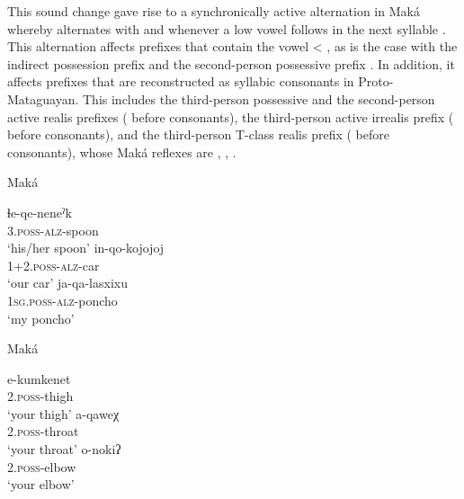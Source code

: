 This sound change gave rise to a synchronically active alternation in Maká whereby  alternates with  and  whenever a low vowel follows in the next syllable \citep[106–108]{AG-BG03}. This alternation affects prefixes that contain the vowel  < , as is the case with the indirect possession prefix   and the second-person possessive prefix  . In addition, it affects prefixes that are reconstructed as syllabic consonants in Proto-Mataguayan. This includes the third-person possessive and the second-person active realis prefixes ( before consonants), the third-person active irrealis prefix ( before consonants), and the third-person T-class realis prefix ( before consonants), whose Maká reflexes are  ,  ,  .

\ea\label{ex-mk-qa-vh}
    Maká \citep[240]{AG-BG03,AG99}
    \begin{xlist}
        \ex\gll ɬe-qe-neneˀk\\
                3.{\textsc{poss-alz}}-spoon\\
                \glt `his/her spoon'
        \ex\gll in-qo-kojojoj\\
                1+2.{\textsc{poss-alz}}-car\\
                \glt `our car'
        \ex\gll ja-qa-lasxixu\\
                1{\textsc{sg.poss-alz}}-poncho\\
                \glt `my poncho'
    \end{xlist}
\z

\ea\label{ex-mk-a-vh}
    Maká \citep[107]{AG-BG03}
    \begin{xlist}
        \ex\gll e-kumkenet\\
                2.{\textsc{poss}}-thigh\\
                \glt `your thigh'
        \ex\gll a-qaweχ\\
                2.{\textsc{poss}}-throat\\
                \glt `your throat'
        \ex\gll o-nokiʔ\\
                2.{\textsc{poss}}-elbow\\
                \glt `your elbow'
    \end{xlist}
\z

